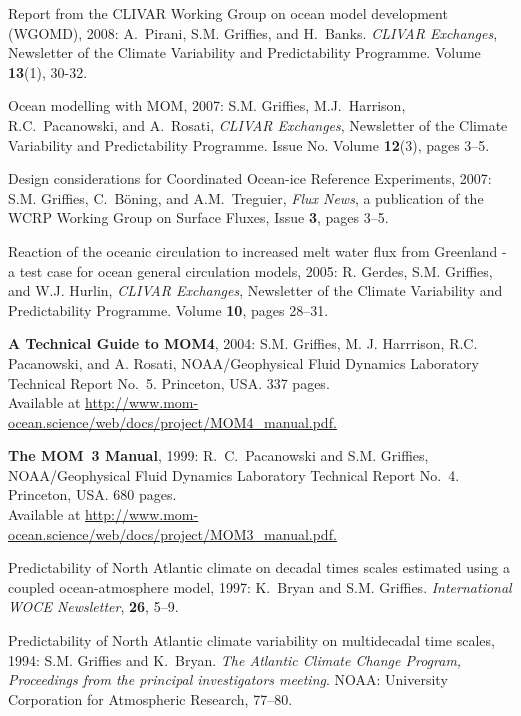 \begin{etaremune}
\item Report from the CLIVAR Working Group on ocean model development (WGOMD), 2008: A.\ Pirani, S.M. Grif\/f\/ies, and H.\ Banks. {\em CLIVAR Exchanges}, Newsletter of the Climate Variability and Predictability Programme.  Volume {\bf 13}(1), 30-32.

\item Ocean modelling with MOM, 2007: S.M. Grif\/f\/ies, M.J.\ Harrison, R.C.\ Pacanowski, and A.\ Rosati, {\em CLIVAR Exchanges}, Newsletter of the Climate Variability and Predictability Programme. Issue No. Volume {\bf 12}(3), pages 3--5.

\item Design considerations for Coordinated Ocean-ice Reference Experiments, 2007: S.M. Grif\/f\/ies, C.\ B\"oning, and A.M.\ Treguier, {\em Flux News}, a publication of the WCRP Working Group on Surface Fluxes, Issue {\bf 3}, pages 3--5.

\item Reaction of the oceanic circulation to increased melt water flux from Greenland - a test case for ocean general circulation models, 2005: R. Gerdes, S.M. Grif\/f\/ies, and W.J. Hurlin, {\em CLIVAR Exchanges}, Newsletter of the Climate Variability and Predictability Programme.  Volume {\bf 10}, pages 28--31.

\item {\bf A Technical Guide to MOM4}, 2004: S.M. Grif\/f\/ies, M. J. Harrrison, R.C. Pacanowski, and A. Rosati, NOAA/Geophysical Fluid Dynamics Laboratory Technical Report No.\ 5. Princeton, USA. 337 pages.  \\
Available at  \href{http://www.mom-ocean.science/web/docs/project/MOM4_manual.pdf}{http://www.mom-ocean.science/web/docs/project/MOM4\_manual.pdf.}

\item {\bf The MOM~3 Manual}, 1999: R.\ C.\ Pacanowski and S.M. Grif\/f\/ies,  NOAA/Geophysical Fluid Dynamics Laboratory Technical Report No.\ 4. Princeton, USA.  680 pages.  \\ Available at
\href{http://www.mom-ocean.science/web/docs/project/MOM3_manual.pdf}{http://www.mom-ocean.science/web/docs/project/MOM3\_manual.pdf.}
  
\item Predictability of North Atlantic climate on decadal times scales estimated using a coupled ocean-atmosphere model, 1997: K.\ Bryan and S.M. Grif\/f\/ies.  {\em International WOCE Newsletter}, {\bf 26}, 5--9.

\item Predictability of North Atlantic climate variability on multidecadal time scales, 1994: S.M. Grif\/f\/ies and K.\ Bryan.  {\em The Atlantic Climate Change Program, Proceedings from the principal investigators meeting}.  NOAA: University Corporation for Atmospheric Research, 77--80.

\end{etaremune}

